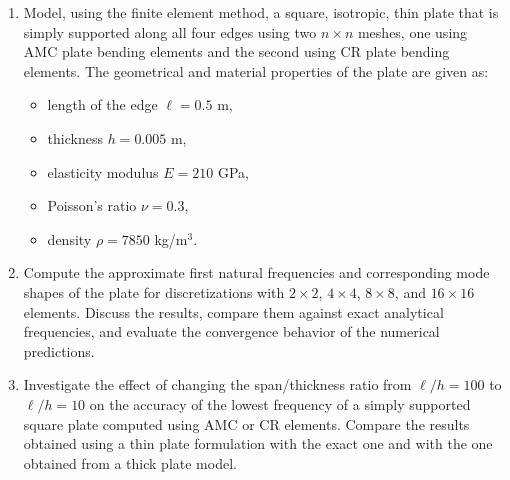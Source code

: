 \documentclass[12pt]{article}
\begin{document}
\begin{enumerate}
  \item[a)] Model, using the finite element method, a square, isotropic, thin plate that is simply supported along all four edges using two $n \times n$ meshes, one using AMC plate bending elements and the second using CR plate bending elements. The geometrical and material properties of the plate are given as:
        \begin{itemize}
          \item length of the edge \(\ell=0.5\) m,
          \item thickness \(h=0.005\) m,
          \item elasticity modulus \(E=210\) GPa,
          \item Poisson's ratio $\nu=0.3$,
          \item density \(\rho=7850\) kg/m$^3$.
        \end{itemize}

  \item[b)] Compute the approximate first natural frequencies and corresponding mode shapes of the plate for discretizations with $2 \times 2$, $4 \times 4$, $8 \times 8$, and $16 \times 16$ elements. Discuss the results, compare them against exact analytical frequencies, and evaluate the convergence behavior of the numerical predictions.

  \item[c)] Investigate the effect of changing the span/thickness ratio from $\ell/h=100$ to $\ell/h=10$ on the accuracy of the lowest frequency of a simply supported square plate computed using AMC or CR elements. Compare the results obtained using a thin plate formulation with the exact one and with the one obtained from a thick plate model.
\end{enumerate}
\end{document}
